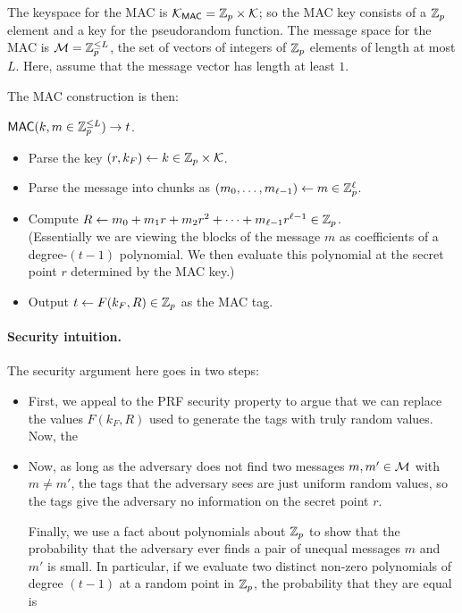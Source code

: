 The keyspace for the MAC is $\mathcal{K}_\mathsf{MAC} = \mathbb{Z}_p \times \mathcal{K}$;
so the MAC key consists of a $\mathbb{Z}_p$ element and a key for 
the pseudorandom function.
The message space for the MAC is $\mathcal{M} = \mathbb{Z}_p^{\leq L}$,
the set of vectors of integers of $\mathbb{Z}_p$ elements of length
at most $L$.
Here, assume that the message vector has length at least $1$.

The MAC construction is then:

\medskip
\noindent
$\mathsf{MAC}(k, m \in \mathbb{Z}^{\leq L}_p) \to t$.
\begin{itemize}
  \item Parse the key $(r, k_F) \gets k \in \mathbb{Z}_p \times \mathcal{K}$. 
  \item Parse the message into chunks as $(m_0, \dots, m_{\ell-1}) \gets m \in \mathbb{Z}_p^\ell$.
  \item Compute $R \gets m_0 + m_1 r + m_2 r^2 + \cdots + m_{\ell-1} r^{\ell-1} \in \mathbb{Z}_p$. \\
        (Essentially we are viewing the blocks of the message $m$ as coefficients of a degree-$(t-1)$
        polynomial. We then evaluate this polynomial at the secret point $r$ determined by the MAC key.)
  \item Output $t \gets F(k_F, R) \in \mathbb{Z}_p$ as the MAC tag.
\end{itemize}

\paragraph{Security intuition.}
The security argument here goes in two steps:
\begin{itemize}
  \item First, we appeal to the PRF security property to argue
        that we can replace the values $F(k_F, R)$ used to generate
        the tags with truly random values.
        Now, the 
  \item Now, as long as the adversary does not find two messages
        $m,m' \in \mathcal{M}$ with $m \neq m'$, the tags that the 
        adversary sees are just uniform random values, so the
        tags give the adversary no information on the secret point $r$.

        Finally, we use a fact about polynomials about $\mathbb{Z}_p$ to show
        that the probability that the adversary ever finds a pair of
        unequal messages $m$ and $m'$ is small.
        In particular, if we evaluate two distinct non-zero polynomials
        of degree $(t-1)$ at a random point in $\mathbb{Z}_p$, the probability
        that they are equal is 
        
\end{itemize}

